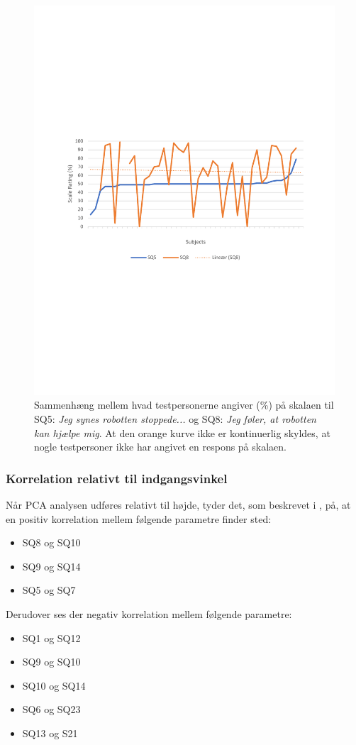 \begin{figure}[H]
	\centering
	\includegraphics[width=\textwidth]{Figure/Korrelationsgrafer/SQ5+SQ8}
	\caption{Sammenhæng mellem hvad testpersonerne angiver (\%) på skalaen til SQ5: \textit{Jeg synes robotten stoppede...} og SQ8: \textit{Jeg føler, at robotten kan hjælpe mig}. At den orange kurve ikke er kontinuerlig skyldes, at nogle testpersoner ikke har angivet en respons på skalaen.}
	\label{fig:SammenligningSQ5SQ8}
\end{figure}
\noindent
%





\subsubsection{Korrelation relativt til indgangsvinkel}
Når PCA analysen udføres relativt til højde, tyder det, som beskrevet i , på, at en positiv korrelation mellem følgende parametre finder sted:
\begin{itemize}
	\item SQ8 og SQ10
	\item SQ9 og SQ14
	\item SQ5 og SQ7
\end{itemize}
%
Derudover ses der negativ korrelation mellem følgende parametre:
\begin{itemize}
	\item SQ1 og SQ12
	\item SQ9 og SQ10
	\item SQ10 og SQ14
	\item SQ6 og SQ23
	\item SQ13 og S21
\end{itemize}